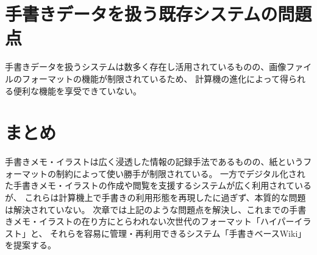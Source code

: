 \section{手書きデータを扱う既存システムの問題点}
手書きデータを扱うシステムは数多く存在し活用されているものの、画像ファイルのフォーマットの機能が制限されているため、
計算機の進化によって得られる便利な機能を享受できていない。

\section{まとめ}
手書きメモ・イラストは広く浸透した情報の記録手法であるものの、紙というフォーマットの制約によって使い勝手が制限されている。
一方でデジタル化された手書きメモ・イラストの作成や閲覧を支援するシステムが広く利用されているが、
これらは計算機上で手書きの利用形態を再現したに過ぎず、本質的な問題は解決されていない。
次章では上記のような問題点を解決し、これまでの手書きメモ・イラストの在り方にとらわれない次世代のフォーマット「ハイパーイラスト」と、
それらを容易に管理・再利用できるシステム「手書きベースWiki」を提案する。